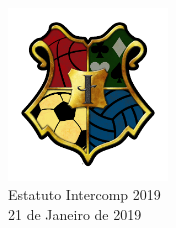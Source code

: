 \begin{center}

	\vspace*{\fill}
	{\let\clearpage\relax \includegraphics[width=120pt]{../logo-inter019.png} \\ [.5cm]}
	\Huge{Estatuto Intercomp 2019} \\ [.5cm]
	\normalsize{21 de Janeiro de 2019}
	\vspace*{\fill}

\end{center}
